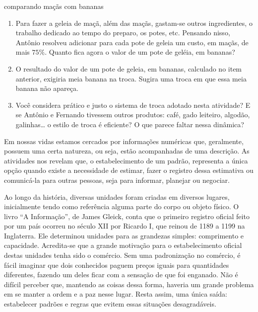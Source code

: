 \begin{task}{comparando maçãs com bananas}
\begin{enumerate}
\item {} 
Para fazer a geleia de maçã, além das maçãs, gastam-se outros ingredientes, o trabalho dedicado ao tempo do preparo, os potes, etc. Pensando nisso, Antônio resolveu adicionar para cada pote de geleia um custo, em maçãs, de mais $75\%$. Quanto fica agora o valor de um pote de geléia, em bananas?

\item {} 
O resultado do valor de um pote de geleia, em bananas, calculado no item anterior, exigiria meia banana na troca. Sugira uma troca em que essa meia banana não apareça.

\item {} 
Você considera prático e justo o sistema de troca adotado nesta atividade? E se Antônio e Fernando tivessem outros produtos: café, gado leiteiro, algodão, galinhas… o estilo de troca é eficiente? O que parece faltar nessa dinâmica?

\end{enumerate}
\end{task}

\label{\detokenize{NO103-0:organizando-as-ideias-um-pouco-de-historia}}
Em nossas vidas estamos cercados por informações numéricas que, geralmente, possuem uma certa natureza, ou seja, estão acompanhadas de uma descrição. As atividades nos revelam que, o estabelecimento de um padrão, representa a única opção quando existe a necessidade de estimar, fazer o registro dessa estimativa ou comunicá-la para outras pessoas, seja para informar, planejar ou negociar.

Ao longo da história, diversas unidades foram criadas em diversos lugares, inicialmente tendo como referência alguma parte do corpo ou objeto físico. O livro “A Informação”, de James Gleick, conta que o primeiro registro oficial feito por um país ocorreu no século XII por Ricardo I, que reinou de 1189 a 1199 na Inglaterra. Ele determinou unidades para as grandezas simples: comprimento e  capacidade. Acredita-se que a grande motivação para o estabelecimento oficial destas unidades tenha sido o comércio. Sem uma padronização no comércio, é fácil imaginar que dois conhecidos paguem preços iguais para quantidades diferentes, fazendo um deles ficar com a sensação de que foi enganado. Não é difícil perceber que, mantendo as coisas dessa forma, haveria um grande problema em se manter a ordem e a paz nesse lugar. Resta assim, uma única saída: estabelecer padrões e regras que evitem essas situações desagradáveis.

